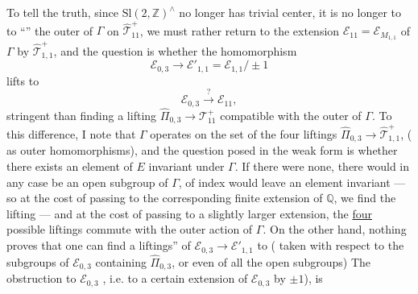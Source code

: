 To tell the truth, since $\mathrm{Sl}(2,\mathbb Z)^{\wedge}$ no longer has trivial center, it is no longer   to  to ``''  the outer  of $\Gamma$ on $\widehat{\mathcal T}_{11}^{+}$, we must rather return to the extension $\mathcal E_{11}=\mathcal E_{M_{1,1}}$ of $\Gamma$ by $\widehat{\mathcal T}_{1,1}^{+}$, and the question is whether the homomorphism
\[
\mathcal E_{0,3}\longrightarrow\mathcal E'_{1,1}=\mathcal E_{1,1}/\pm1
\]
lifts to
\[
\mathcal E_{0,3}\xrightarrow{?}\mathcal E_{11},
\]
 stringent than finding a lifting $\widehat{\Pi}_{0,3}\longrightarrow\mathcal T_{11}^{+}$ compatible with the outer  of $\Gamma$. To  this difference, I note that $\Gamma$ operates on the set of the four liftings  $\widehat{\Pi}_{0,3}\longrightarrow\widehat{\mathcal T}_{1,1}^{+}$, ( as outer homomorphisms), and the
question posed in the weak form is whether there exists an element of $E$ invariant under $\Gamma$. If there were none, there would in any case be an open subgroup of $\Gamma$, of index    would leave an element invariant --- so at the cost of passing to the  corresponding finite extension of $\mathbb Q$, we find the lifting --- and at the cost of passing to a slightly larger extension, the \uline{four} possible liftings commute with the outer action of $\Gamma$. On the other hand, nothing proves that one can find a  liftings''  of $\mathcal E_{0,3}\longrightarrow\mathcal E'_{1,1}$ to  ( taken with respect to the subgroups  of $\mathcal E_{0,3}$  containing $\widehat\Pi_{0,3}$, or even of all the open subgroups) The obstruction to  $\mathcal E_{0,3}$ , i.e. to \uline{} a certain extension of $\mathcal E_{0,3}$ by  $\pm1$), is
